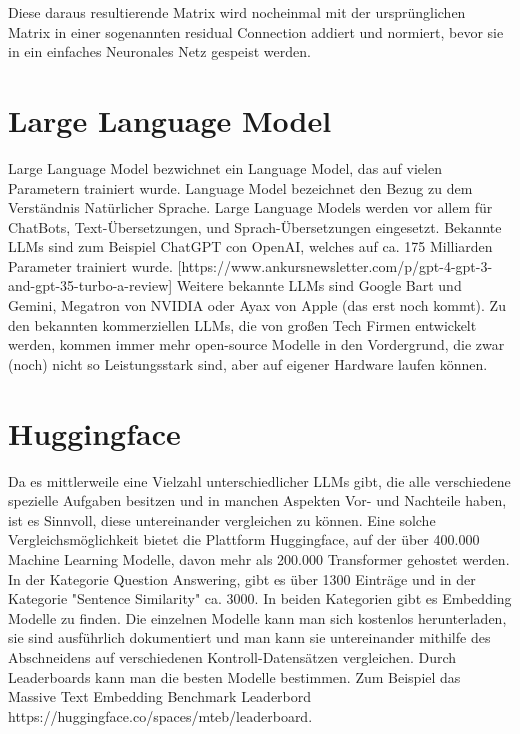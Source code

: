 Diese daraus resultierende Matrix wird nocheinmal mit der ursprünglichen Matrix in einer sogenannten residual Connection addiert und normiert, bevor sie in ein einfaches Neuronales Netz gespeist werden.

\section{Large Language Model}

Large Language Model bezwichnet ein Language Model, das auf vielen Parametern trainiert wurde. 
Language Model bezeichnet den Bezug zu dem Verständnis Natürlicher Sprache.
Large Language Models werden vor allem für ChatBots, Text-Übersetzungen, und Sprach-Übersetzungen eingesetzt.
Bekannte LLMs sind zum Beispiel ChatGPT con OpenAI, welches auf ca. 175 Milliarden Parameter trainiert wurde. [https://www.ankursnewsletter.com/p/gpt-4-gpt-3-and-gpt-35-turbo-a-review]
Weitere bekannte LLMs sind Google Bart und Gemini, Megatron von NVIDIA oder Ayax von Apple (das erst noch kommt).
Zu den bekannten kommerziellen LLMs, die von großen Tech Firmen entwickelt werden, kommen immer mehr open-source Modelle in den Vordergrund, die zwar (noch) nicht so Leistungsstark sind, aber auf eigener Hardware laufen können.



\section{Huggingface}

Da es mittlerweile eine Vielzahl unterschiedlicher LLMs gibt, die alle verschiedene spezielle Aufgaben besitzen und in manchen Aspekten Vor- und Nachteile haben, ist es Sinnvoll, diese untereinander vergleichen zu können.
Eine solche Vergleichsmöglichkeit bietet die Plattform Huggingface, auf der über 400.000 Machine Learning Modelle, davon mehr als 200.000 Transformer gehostet werden.
In der Kategorie Question Answering, gibt es über 1300 Einträge und in der Kategorie "Sentence Similarity" ca. 3000.
In beiden Kategorien gibt es Embedding Modelle zu finden.
Die einzelnen Modelle kann man sich kostenlos herunterladen, sie sind ausführlich dokumentiert und man kann sie untereinander mithilfe des Abschneidens auf verschiedenen Kontroll-Datensätzen vergleichen.
Durch Leaderboards kann man die besten Modelle bestimmen.
Zum Beispiel das Massive Text Embedding Benchmark Leaderbord https://huggingface.co/spaces/mteb/leaderboard.



